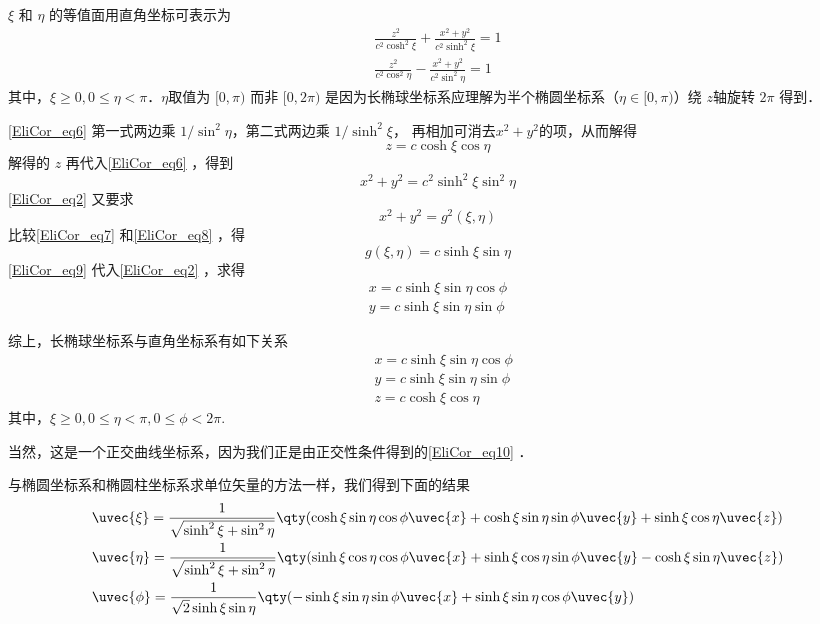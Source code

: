 $\xi$ 和 $\eta$ 的等值面用直角坐标可表示为
\begin{equation}\label{EliCor_eq6}
\begin{aligned}
\frac{z^2}{c^2\cosh^2\xi}+\frac{x^2+y^2}{c^2\sinh^2\xi}=1\\
\frac{z^2}{c^2\cos^2\eta}-\frac{x^2+y^2}{c^2\sin^2\eta}=1
\end{aligned}
\end{equation}
其中，$\xi\geq 0,0\leq\eta<\pi$．$\eta$取值为 $[0,\pi)$ 而非 $[0,2\pi)$ 是因为长椭球坐标系应理解为半个椭圆坐标系（$\eta\in[0,\pi)$）绕 $z$轴旋转 $2\pi$ 得到．

\autoref{EliCor_eq6} 第一式两边乘 $1/\sin^2\eta$，第二式两边乘 $1/\sinh^2\xi$， 再相加可消去$x^2+y^2$的项，从而解得
\begin{equation}
z=c\cosh\xi\cos\eta
\end{equation}
 解得的 $z$ 再代入\autoref{EliCor_eq6} ，得到
 \begin{equation}\label{EliCor_eq7}
 x^2+y^2=c^2\sinh^2\xi\sin^2\eta
 \end{equation}
 \autoref{EliCor_eq2} 又要求
 \begin{equation}\label{EliCor_eq8}
 x^2+y^2=g^2(\xi,\eta)
 \end{equation}
 比较\autoref{EliCor_eq7} 和\autoref{EliCor_eq8} ，得
 \begin{equation}\label{EliCor_eq9}
 g(\xi,\eta)=c\sinh\xi\sin\eta
 \end{equation}
 \autoref{EliCor_eq9} 代入\autoref{EliCor_eq2} ，求得
 \begin{equation}
 \begin{aligned}
 x=c\sinh\xi\sin\eta\cos\phi\\
y=c\sinh\xi\sin\eta\sin\phi
 \end{aligned}
 \end{equation}
 
 综上，长椭球坐标系与直角坐标系有如下关系
 \begin{equation}\label{EliCor_eq10}
 \begin{aligned}
 &x=c\sinh\xi\sin\eta\cos\phi\\
&y=c\sinh\xi\sin\eta\sin\phi\\
&z=c\cosh\xi\cos\eta
 \end{aligned}
 \end{equation}
 其中，$\xi\geq 0,0\leq\eta<\pi,0\leq\phi<2\pi$.
 
 当然，这是一个正交曲线坐标系，因为我们正是由正交性条件得到的\autoref{EliCor_eq10} ．

与椭圆坐标系和椭圆柱坐标系求单位矢量的方法一样，我们得到下面的结果
\begin{equation}
\begin{aligned}
&\uvec{\xi}=\frac{1}{\sqrt{\sinh^2\xi+\sin^2\eta}}\qty(\cosh\xi\sin\eta\cos\phi\uvec{x}+\cosh\xi\sin\eta\sin\phi\uvec{y}+\sinh\xi\cos\eta\uvec{z})\\
&\uvec{\eta}=\frac{1}{\sqrt{\sinh^2\xi+\sin^2\eta}}\qty(\sinh\xi\cos\eta\cos\phi\uvec{x}+\sinh\xi\cos\eta\sin\phi\uvec{y}-\cosh\xi\sin\eta\uvec{z})\\
&\uvec{\phi}=\frac{1}{\sqrt{2}\sinh\xi\sin\eta}\qty(-\sinh\xi\sin\eta\sin\phi\uvec{x}+\sinh\xi\sin\eta\cos\phi\uvec{y})
\end{aligned}
\end{equation}
